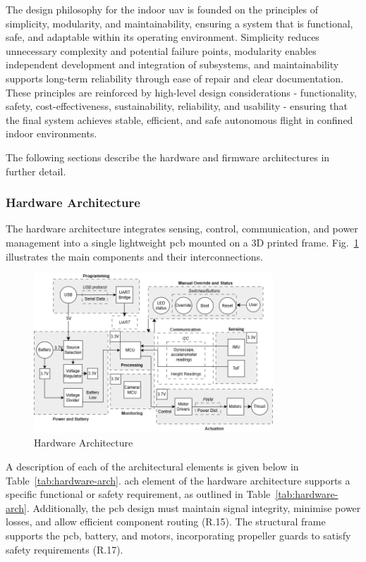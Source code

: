The design philosophy for the indoor \gls{uav} is founded on the principles of simplicity, modularity, and maintainability, ensuring a system that is functional, safe, and adaptable within its operating environment. Simplicity reduces unnecessary complexity and potential failure points, modularity enables independent development and integration of subsystems, and maintainability supports long-term reliability through ease of repair and clear documentation. These principles are reinforced by high-level design considerations - functionality, safety, cost-effectiveness, sustainability, reliability, and usability - ensuring that the final system achieves stable, efficient, and safe autonomous flight in confined indoor environments.

The following sections describe the hardware and firmware architectures in further detail.

\subsubsection{Hardware Architecture}

The hardware architecture integrates sensing, control, communication, and power management into a single lightweight \gls{pcb} mounted on a 3D printed frame. Fig.~\ref{fig:block-hardware} illustrates the main components and their interconnections. 

\begin{figure}[H]
    \centering
    \captionsetup{justification=centering, margin=1cm}
    \includegraphics[width=0.8\textwidth]{img/block-hardware-gray.PNG}
    \caption{Hardware Architecture}
    \label{fig:block-hardware}
\end{figure}

A description of each of the architectural elements is given below in Table~\ref{tab:hardware-arch}.  ach element of the hardware architecture supports a specific functional or safety requirement, as outlined in Table~\ref{tab:hardware-arch}. Additionally, the \gls{pcb} design must maintain signal integrity, minimise power losses, and allow efficient component routing (R.15). The structural frame supports the \gls{pcb}, battery, and motors, incorporating propeller guards to satisfy safety requirements (R.17).

